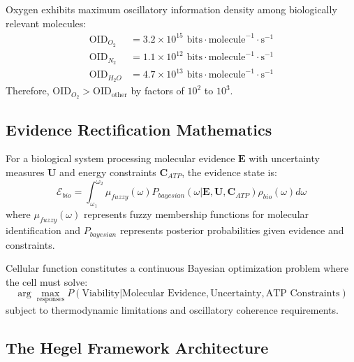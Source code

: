 ﻿\documentclass[11pt,a4paper]{article}
\begin{document}
\begin{theorem}
Oxygen exhibits maximum oscillatory information density among biologically relevant molecules:
\begin{align}
\text{OID}_{O_2} &= 3.2 \times 10^{15} \text{ bits} \cdot \text{molecule}^{-1} \cdot \text{s}^{-1} \\
\text{OID}_{N_2} &= 1.1 \times 10^{12} \text{ bits} \cdot \text{molecule}^{-1} \cdot \text{s}^{-1} \\
\text{OID}_{H_2O} &= 4.7 \times 10^{13} \text{ bits} \cdot \text{molecule}^{-1} \cdot \text{s}^{-1}
\end{align}
Therefore, $\text{OID}_{O_2} > \text{OID}_{\text{other}}$ by factors of $10^2$ to $10^3$.
\end{theorem}

\subsection{Evidence Rectification Mathematics}

\begin{definition}
For a biological system processing molecular evidence $\mathbf{E}$ with uncertainty measures $\mathbf{U}$ and energy constraints $\mathbf{C}_{ATP}$, the evidence state is:
\begin{equation}
\mathcal{E}_{bio} = \int_{\omega_1}^{\omega_2} \mu_{fuzzy}(\omega) P_{bayesian}(\omega | \mathbf{E}, \mathbf{U}, \mathbf{C}_{ATP}) \rho_{bio}(\omega) d\omega
\end{equation}
where $\mu_{fuzzy}(\omega)$ represents fuzzy membership functions for molecular identification and $P_{bayesian}$ represents posterior probabilities given evidence and constraints.
\end{definition}

\begin{theorem}
Cellular function constitutes a continuous Bayesian optimization problem where the cell must solve:
\begin{equation}
\arg\max_{\text{responses}} P(\text{Viability} | \text{Molecular Evidence}, \text{Uncertainty}, \text{ATP Constraints})
\end{equation}
subject to thermodynamic limitations and oscillatory coherence requirements.
\end{theorem}

\subsection{The Hegel Framework Architecture}
\end{document}
